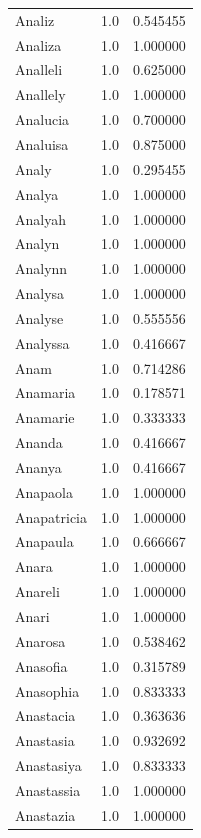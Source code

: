 \documentclass[
  letterpaper,
  DIV=11,
  numbers=noendperiod]{scrreprt}
\begin{document}
\begin{tabular}{lrr}
Analiz          &   1.0 &   0.545455 \\
Analiza         &   1.0 &   1.000000 \\
Analleli        &   1.0 &   0.625000 \\
Anallely        &   1.0 &   1.000000 \\
Analucia        &   1.0 &   0.700000 \\
Analuisa        &   1.0 &   0.875000 \\
Analy           &   1.0 &   0.295455 \\
Analya          &   1.0 &   1.000000 \\
Analyah         &   1.0 &   1.000000 \\
Analyn          &   1.0 &   1.000000 \\
Analynn         &   1.0 &   1.000000 \\
Analysa         &   1.0 &   1.000000 \\
Analyse         &   1.0 &   0.555556 \\
Analyssa        &   1.0 &   0.416667 \\
Anam            &   1.0 &   0.714286 \\
Anamaria        &   1.0 &   0.178571 \\
Anamarie        &   1.0 &   0.333333 \\
Ananda          &   1.0 &   0.416667 \\
Ananya          &   1.0 &   0.416667 \\
Anapaola        &   1.0 &   1.000000 \\
Anapatricia     &   1.0 &   1.000000 \\
Anapaula        &   1.0 &   0.666667 \\
Anara           &   1.0 &   1.000000 \\
Anareli         &   1.0 &   1.000000 \\
Anari           &   1.0 &   1.000000 \\
Anarosa         &   1.0 &   0.538462 \\
Anasofia        &   1.0 &   0.315789 \\
Anasophia       &   1.0 &   0.833333 \\
Anastacia       &   1.0 &   0.363636 \\
Anastasia       &   1.0 &   0.932692 \\
Anastasiya      &   1.0 &   0.833333 \\
Anastassia      &   1.0 &   1.000000 \\
Anastazia       &   1.0 &   1.000000 \\

\end{tabular}
\end{document}
